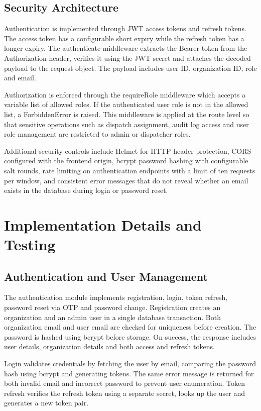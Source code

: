 \documentclass[12pt,a4paper]{report}
\newcommand{\chapterheader}{CHAPTER HEADING}
\begin{document}
\section{Security Architecture}
Authentication is implemented through JWT access tokens and refresh tokens. The access token has a configurable short expiry while the refresh token has a longer expiry. The authenticate middleware extracts the Bearer token from the Authorization header, verifies it using the JWT secret and attaches the decoded payload to the request object. The payload includes user ID, organization ID, role and email.

Authorization is enforced through the requireRole middleware which accepts a variable list of allowed roles. If the authenticated user role is not in the allowed list, a ForbiddenError is raised. This middleware is applied at the route level so that sensitive operations such as dispatch assignment, audit log access and user role management are restricted to admin or dispatcher roles.

Additional security controls include Helmet for HTTP header protection, CORS configured with the frontend origin, bcrypt password hashing with configurable salt rounds, rate limiting on authentication endpoints with a limit of ten requests per window, and consistent error messages that do not reveal whether an email exists in the database during login or password reset.
\clearpage

\renewcommand{\chapterheader}{CHAPTER 4}
\chapter{Implementation Details and Testing}

\section{Authentication and User Management}
The authentication module implements registration, login, token refresh, password reset via OTP and password change. Registration creates an organization and an admin user in a single database transaction. Both organization email and user email are checked for uniqueness before creation. The password is hashed using bcrypt before storage. On success, the response includes user details, organization details and both access and refresh tokens.

Login validates credentials by fetching the user by email, comparing the password hash using bcrypt and generating tokens. The same error message is returned for both invalid email and incorrect password to prevent user enumeration. Token refresh verifies the refresh token using a separate secret, looks up the user and generates a new token pair.
\end{document}

